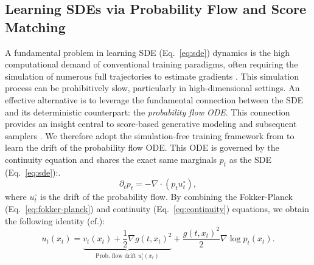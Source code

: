 \documentclass[twoside]{article}
\begin{document}
\subsection{Learning SDEs via Probability Flow and Score Matching}
\label{sec:sde_ode_score_revised}

A fundamental problem in learning SDE (Eq.~\eqref{eq:sde}) dynamics is the high computational demand of conventional training paradigms, often requiring the simulation of numerous full trajectories to estimate gradients \citep[see also][]{kidger2021efficient, ryder2018blackbox, neurips2024_sde_grad, li2020scalable, tzen2019neural}. This simulation process can be prohibitively slow, particularly in high-dimensional settings. An effective alternative is to leverage the fundamental connection between the SDE and its deterministic counterpart: the \emph{probability flow ODE}. This connection provides an insight central to score-based generative modeling and subsequent samplers \citep{song2021score, lu2022dpmsolver, karras2022edm, li2024sharp, cai2025pfode}. We therefore adopt the simulation-free training framework from \citep{tong2023simulationfree} to learn the drift of the probability flow ODE. This ODE is governed by the continuity equation and shares the exact same marginals \(p_t\) as the SDE (Eq.~\ref{eq:sde}):.
\begin{equation}
    \partial_t p_t = -\nabla \cdot (p_t u_t^\circ),
    \label{eq:continuity}
\end{equation}
where \(u_t^\circ\) is the drift of the probability flow. By combining the Fokker-Planck (Eq.~\eqref{eq:fokker-planck}) and continuity (Eq.~\eqref{eq:continuity}) equations, we obtain the following identity (cf.\citep[Eq. 5]{tong2023simulation}):
\begin{equation}
u_t(x_t) = \underbrace{v_t(x_t) + \frac{1}{2}\nabla g(t, x_t)^2}_{\text{Prob. flow drift }u_t^\circ(x_t)} + \frac{g(t,x_t)^2}{2} \nabla \log p_t(x_t).
\label{eq:sde_drift_from_flow_score}
\end{equation}
\end{document}

